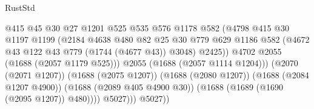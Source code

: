 \begin{lexlean}{RustStd}
\begin{coremodule}
                                              @415
                                              @45
                                              @30
                                              @27
                                              @1201
                                              @525
                                              @535
                                              @576
                                              @1178
                                              @582
                                              (@4798
                                                @415
                                                @30
                                                @1197
                                                @1199
                                                (@2184
                                                  @4638
                                                  @480
                                                  @82
                                                  @25
                                                  @30
                                                  @779
                                                  @629
                                                  @1186
                                                  @582
                                                  (@4672
                                                    @43
                                                    @122
                                                    @43
                                                    @779
                                                    (@1744 (@4677 @43))
                                                    @3048)
                                                  @2425))
                                              @4702
                                              @2055
                                              (@1688 (@2057 @1179 @525)))
                                            @2055
                                            (@1688 (@2057 @1114 @1204)))
                                          (@2070 (@2071 @1207))
                                          (@1688 (@2075 @1207))
                                          (@1688 (@2080 @1207))
                                          (@1688 (@2084 @1207 @4900))
                                          (@1688 (@2089 @405 @4900 @30))
                                          (@1688 (@1689 (@1690 (@2095 @1207)) @480))))
                                      @5027)))
                                @5027))

\end{coremodule}
\end{lexlean}
